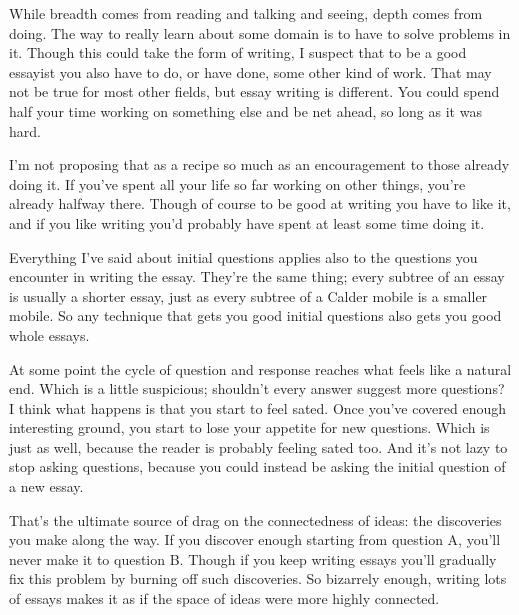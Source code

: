 While
                  breadth comes from reading and talking and seeing, depth comes
                  from doing. The way to really learn about some domain is to
                  have to solve problems in it. Though this could take the form
                  of writing, I suspect that to be a good essayist you also have
                  to do, or have done, some other kind of work. That may not be
                  true for most other fields, but essay writing is different.
                  You could spend half your time working on something else and
                  be net ahead, so long as it was hard.

I'm not
                  proposing that as a recipe so much as an encouragement to
                  those already doing it. If you've spent all your life so far
                  working on other things, you're already halfway there. Though
                  of course to be good at writing you have to like it, and if
                  you like writing you'd probably have spent at least some time
                  doing it.

Everything I've said about initial
                  questions applies also to the questions you encounter in
                  writing the essay. They're the same thing; every subtree of an
                  essay is usually a shorter essay, just as every subtree of a
                  Calder mobile is a smaller mobile. So any technique that gets
                  you good initial questions also gets you good whole essays.

At
                  some point the cycle of question and response reaches what
                  feels like a natural end. Which is a little suspicious;
                  shouldn't every answer suggest more questions? I think what
                  happens is that you start to feel sated. Once you've covered
                  enough interesting ground, you start to lose your appetite for
                  new questions. Which is just as well, because the reader is
                  probably feeling sated too. And it's not lazy to stop asking
                  questions, because you could instead be asking the initial
                  question of a new essay.

That's the ultimate source
                  of drag on the connectedness of ideas: the discoveries you
                  make along the way. If you discover enough starting from
                  question A, you'll never make it to question B. Though if you
                  keep writing essays you'll gradually fix this problem by
                  burning off such discoveries. So bizarrely enough, writing
                  lots of essays makes it as if the space of ideas were more
                  highly connected.

